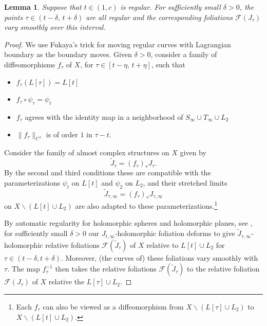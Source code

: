 \documentclass[12pt]{amsart}
\newtheorem{lemma}[theorem]{Lemma}
\theoremstyle{definition}
\begin{document}
\medskip



\begin{lemma}\label{lem:fam}
Suppose that $t \in (1,c)$ is regular. For sufficiently small $\delta>0$,  the points $\tau \in (t - \delta, \, t+\delta)$ are all regular and the corresponding foliations $\mathcal{F}(J_\tau)$ vary smoothly over this interval. 
\end{lemma}

\begin{proof}
We use Fukaya's trick for moving regular curves with Lagrangian boundary as the boundary moves. Given $\delta > 0$, consider a family of diffeomorphisms $f_{\tau}$ of $X$, for $\tau \in [t - \eta, \, t+\eta]$, 
such that 
\medskip

\begin{itemize}
    \item $f_{\tau}(L[\tau]) =L[t]$ \\
    \item $f_{\tau} \circ \psi_{\tau} = \psi_{t}$ \\
    \item $f_{\tau}$ agrees with the identity map in a neighborhood of $S_{\infty}\cup T_{\infty} \cup L_2$ \\
    \item $\|f_{\tau}\|_{C^1}$ is of order $1$ in $\tau -t$.\\
\end{itemize}
Consider the family of almost complex structures on $X$ given by $$\widetilde{J}_{\tau} = (f_{\tau})_*J_{\tau}.$$ By the second and third conditions these are compatible with the parameterizations $\psi_{t}$ on $L[t]$ and $\psi_2$ on $L_2$, and their stretched limits $$\widetilde{J}_{\tau, \infty} = (f_{\tau})_*J_{\tau,\infty} $$  on $X \smallsetminus (L[t] \cup L_2)$ are also adapted to these parameterizations.\footnote{Each $f_{\tau}$ can also be viewed as a diffeomorphism from $X \smallsetminus (L[\tau] \cup L_2)$ to $ X \smallsetminus (L[t] \cup L_2)$.}

By automatic regularity for holomorphic spheres and holomorphic planes, see \cite[Theorem 1]{we}, for sufficiently small $\delta>0$ our $J_{t, \infty}$-holomorphic foliation deforms to give $\widetilde{J}_{\tau, \infty}$-holomorphic relative foliations $\mathcal{F}(\widetilde{J}_\tau)$ of $X$ relative to $L[t] \cup L_2$ for $\tau \in (t-\delta, t+\delta)$. Moreover, (the curves of) these foliations vary smoothly with $\tau$. The map $f^{-1}_{\tau}$ then takes the relative foliations $\mathcal{F}(\widetilde{J}_\tau)$ to the relative foliation $\mathcal{F}(J_\tau)$ of $X$ relative the $L[\tau] \cup L_2$.
\end{proof}
\end{document}
